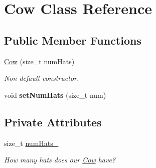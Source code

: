 \hypertarget{class_cow}{}\section{Cow Class Reference}
\label{class_cow}
\subsection*{Public Member Functions}
\begin{DoxyCompactItemize}
\item 
\mbox{\label{class_cow_a7d60406c5ed4761cf6e71c329762255f}} 
\hyperlink{class_cow_a7d60406c5ed4761cf6e71c329762255f}{Cow} (size\+\_\+t num\+Hats)
\begin{DoxyCompactList}\small\item\em Non-\/default constructor. \end{DoxyCompactList}\item 
\mbox{\label{class_cow_acc8cd271a66fe22e8c46ffdcdad24a39}} 
void {\bfseries set\+Num\+Hats} (size\+\_\+t num)
\end{DoxyCompactItemize}
\subsection*{Private Attributes}
\begin{DoxyCompactItemize}
\item 
\mbox{\label{class_cow_a29edbbdc2d256dcf105b718258bacce9}} 
size\+\_\+t \hyperlink{class_cow_a29edbbdc2d256dcf105b718258bacce9}{num\+Hats\+\_\+}
\begin{DoxyCompactList}\small\item\em How many hats does our \hyperlink{class_cow}{Cow} have? \end{DoxyCompactList}\end{DoxyCompactItemize}
